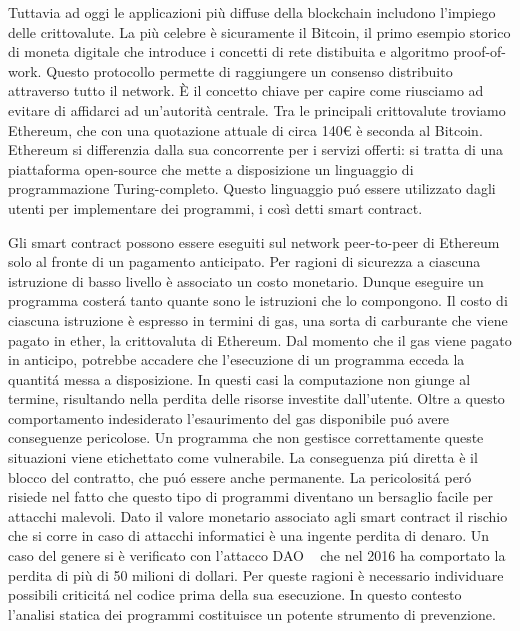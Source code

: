 
\indent Tuttavia ad oggi le applicazioni più diffuse della blockchain includono l'impiego delle crittovalute. La più celebre è sicuramente il Bitcoin, il primo esempio storico di moneta digitale che introduce i concetti di rete distibuita e algoritmo proof-of-work. Questo protocollo permette di raggiungere un consenso distribuito attraverso tutto il network. \`E il concetto chiave per capire come riusciamo ad evitare di affidarci ad un'autorità centrale.\newline
\indent Tra le principali crittovalute troviamo Ethereum, che con una quotazione attuale di circa 140\euro{} è seconda al Bitcoin. Ethereum si differenzia dalla sua concorrente per i servizi offerti: si tratta di una piattaforma open-source che mette a disposizione un linguaggio di programmazione Turing-completo. Questo linguaggio puó essere utilizzato dagli utenti per implementare dei programmi, i così detti smart contract.\newline

\indent Gli smart contract possono essere eseguiti sul network peer-to-peer di Ethereum solo al fronte di un pagamento anticipato. Per ragioni di sicurezza a ciascuna istruzione di basso livello è associato un costo monetario. Dunque eseguire un programma costerá tanto quante sono le istruzioni che lo compongono. Il costo di ciascuna istruzione è espresso in termini di gas, una sorta di carburante che viene pagato in ether, la crittovaluta di Ethereum. Dal momento che il gas viene pagato in anticipo, potrebbe accadere che l'esecuzione di un programma ecceda la quantitá messa a disposizione. In questi casi la computazione non giunge al termine, risultando nella perdita delle risorse investite dall'utente.\newline
\indent Oltre a questo comportamento indesiderato l'esaurimento del gas disponibile puó avere conseguenze pericolose. Un programma che non gestisce correttamente queste situazioni viene etichettato come vulnerabile. La conseguenza piú diretta è il blocco del contratto, che puó essere anche permanente. La pericolositá peró risiede nel fatto che questo tipo di programmi diventano un bersaglio facile per attacchi malevoli. Dato il valore monetario associato agli smart contract il rischio che si corre in caso di attacchi informatici è una ingente perdita di denaro. Un caso del genere si è verificato con l'attacco DAO ~\cite{} che nel 2016 ha comportato la perdita di più di 50 milioni di dollari.\newline 
\indent Per queste ragioni è necessario individuare possibili criticitá nel codice prima della sua esecuzione. In questo contesto l'analisi statica dei programmi costituisce un potente strumento di prevenzione.\newline

